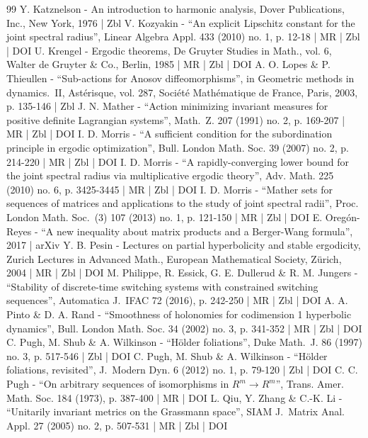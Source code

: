 \begin{thebibliography}{99}
Y. Katznelson - An introduction to harmonic analysis, Dover Publications, Inc., New York, 1976 | Zbl
V. Kozyakin - “An explicit Lipschitz constant for the joint spectral radius”, Linear Algebra Appl. 433 (2010) no. 1, p. 12-18 | MR | Zbl | DOI
U. Krengel - Ergodic theorems, De Gruyter Studies in Math., vol. 6, Walter de Gruyter \& Co., Berlin, 1985 | MR | Zbl | DOI
A. O. Lopes \& P. Thieullen - “Sub-actions for Anosov diffeomorphisms”, in Geometric methods in dynamics. II, Astérisque, vol. 287, Société Mathématique de France, Paris, 2003, p. 135-146 | Zbl
J. N. Mather - “Action minimizing invariant measures for positive definite Lagrangian systems”, Math. Z. 207 (1991) no. 2, p. 169-207 | MR | Zbl | DOI
I. D. Morris - “A sufficient condition for the subordination principle in ergodic optimization”, Bull. London Math. Soc. 39 (2007) no. 2, p. 214-220 | MR | Zbl | DOI
I. D. Morris - “A rapidly-converging lower bound for the joint spectral radius via multiplicative ergodic theory”, Adv. Math. 225 (2010) no. 6, p. 3425-3445 | MR | Zbl | DOI
I. D. Morris - “Mather sets for sequences of matrices and applications to the study of joint spectral radii”, Proc. London Math. Soc. (3) 107 (2013) no. 1, p. 121-150 | MR | Zbl | DOI
E. Oregón-Reyes - “A new inequality about matrix products and a Berger-Wang formula”, 2017 | arXiv
Y. B. Pesin - Lectures on partial hyperbolicity and stable ergodicity, Zurich Lectures in Advanced Math., European Mathematical Society, Zürich, 2004 | MR | Zbl | DOI
M. Philippe, R. Essick, G. E. Dullerud \& R. M. Jungers - “Stability of discrete-time switching systems with constrained switching sequences”, Automatica J. IFAC 72 (2016), p. 242-250 | MR | Zbl | DOI
A. A. Pinto \& D. A. Rand - “Smoothness of holonomies for codimension 1 hyperbolic dynamics”, Bull. London Math. Soc. 34 (2002) no. 3, p. 341-352 | MR | Zbl | DOI
C. Pugh, M. Shub \& A. Wilkinson - “Hölder foliations”, Duke Math. J. 86 (1997) no. 3, p. 517-546 | Zbl | DOI
C. Pugh, M. Shub \& A. Wilkinson - “Hölder foliations, revisited”, J. Modern Dyn. 6 (2012) no. 1, p. 79-120 | Zbl | DOI
C. C. Pugh - “On arbitrary sequences of isomorphisms in $R^{m}\rightarrow R^{m}$”, Trans. Amer. Math. Soc. 184 (1973), p. 387-400 | MR | DOI
L. Qiu, Y. Zhang \& C.-K. Li - “Unitarily invariant metrics on the Grassmann space”, SIAM J. Matrix Anal. Appl. 27 (2005) no. 2, p. 507-531 | MR | Zbl | DOI

\end{thebibliography}

